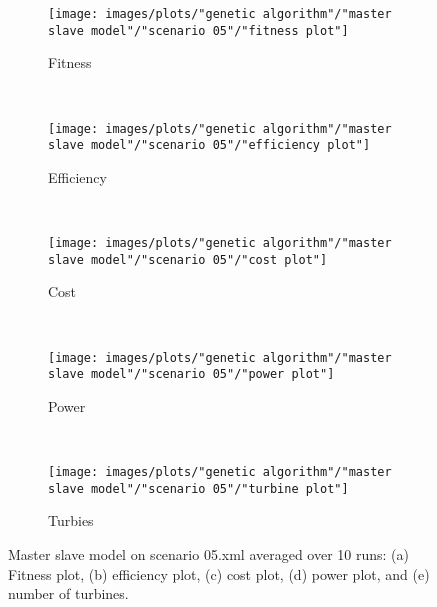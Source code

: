 \begin{figure}[h!]
    \centering
      \begin{subfigure}[b]{0.31\textwidth}
        \texttt{[image: images/plots/"genetic algorithm"/"master slave model"/"scenario 05"/"fitness plot"]}
        \caption{Fitness}
        \hfill
        \label{plot:master slave model fitness plot scenario 00}
    \end{subfigure}
    ~
      \begin{subfigure}[b]{0.31\textwidth}
        \texttt{[image: images/plots/"genetic algorithm"/"master slave model"/"scenario 05"/"efficiency plot"]}
        \caption{Efficiency}
        \hfill
        \label{plot:single point crossover}
    \end{subfigure}
    ~
    \begin{subfigure}[b]{0.31\textwidth}
        \texttt{[image: images/plots/"genetic algorithm"/"master slave model"/"scenario 05"/"cost plot"]}
        \caption{Cost}
        \hfill
        \label{plot:single point crossover}
    \end{subfigure}
    ~
    \begin{subfigure}[b]{0.31\textwidth}
        \texttt{[image: images/plots/"genetic algorithm"/"master slave model"/"scenario 05"/"power plot"]}
        \caption{Power}
        \hfill
        \label{plot:two point crossover}
    \end{subfigure}
    ~
    \begin{subfigure}[b]{0.31\textwidth}
        \texttt{[image: images/plots/"genetic algorithm"/"master slave model"/"scenario 05"/"turbine plot"]}
        \caption{Turbies}
        \hfill
        \label{plot:uniform crossover}
    \end{subfigure}
    \caption{Master slave model on scenario 05.xml averaged over 10 runs: (a) Fitness plot, (b) efficiency plot, (c) cost plot, (d) power plot, and (e) number of turbines.}
    \label{plot:master slave scenario 05}
\end{figure}


